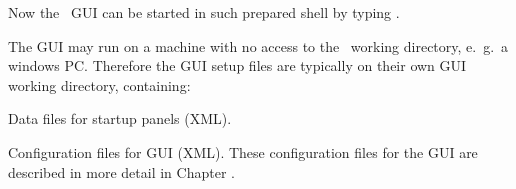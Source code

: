 \item Now the \mbs\ GUI can be started in such prepared shell by typing 
.

\enum

\medskip

The GUI may run on a machine with no access to the \mbs\ working directory,
e.~g.\ a windows PC.
Therefore the GUI setup files are typically on their own GUI 
working directory, containing: 
\bbul
\item Data files for startup panels (XML).
\item Configuration files for GUI (XML).
\ebul
These configuration files for the GUI are described in more detail 
in Chapter .


